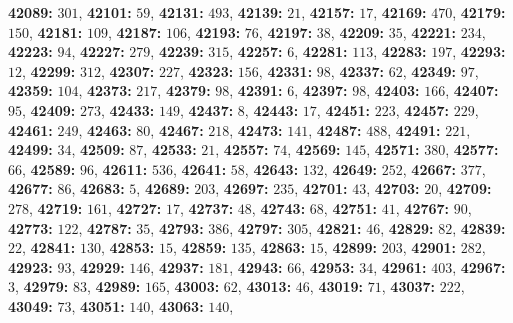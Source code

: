 \textsf{\bfseries 42089:} $301$, \textsf{\bfseries 42101:} $59$, \textsf{\bfseries 42131:} $493$, \textsf{\bfseries 42139:} $21$, \textsf{\bfseries 42157:} $17$, \textsf{\bfseries 42169:} $470$, \textsf{\bfseries 42179:} $150$, \textsf{\bfseries 42181:} $109$, \textsf{\bfseries 42187:} $106$, \textsf{\bfseries 42193:} $76$, \textsf{\bfseries 42197:} $38$, \textsf{\bfseries 42209:} $35$, \textsf{\bfseries 42221:} $234$, \textsf{\bfseries 42223:} $94$, \textsf{\bfseries 42227:} $279$, \textsf{\bfseries 42239:} $315$, \textsf{\bfseries 42257:} $6$, \textsf{\bfseries 42281:} $113$, \textsf{\bfseries 42283:} $197$, \textsf{\bfseries 42293:} $12$, \textsf{\bfseries 42299:} $312$, \textsf{\bfseries 42307:} $227$, \textsf{\bfseries 42323:} $156$, \textsf{\bfseries 42331:} $98$, \textsf{\bfseries 42337:} $62$, \textsf{\bfseries 42349:} $97$, \textsf{\bfseries 42359:} $104$, \textsf{\bfseries 42373:} $217$, \textsf{\bfseries 42379:} $98$, \textsf{\bfseries 42391:} $6$, \textsf{\bfseries 42397:} $98$, \textsf{\bfseries 42403:} $166$, \textsf{\bfseries 42407:} $95$, \textsf{\bfseries 42409:} $273$, \textsf{\bfseries 42433:} $149$, \textsf{\bfseries 42437:} $8$, \textsf{\bfseries 42443:} $17$, \textsf{\bfseries 42451:} $223$, \textsf{\bfseries 42457:} $229$, \textsf{\bfseries 42461:} $249$, \textsf{\bfseries 42463:} $80$, \textsf{\bfseries 42467:} $218$, \textsf{\bfseries 42473:} $141$, \textsf{\bfseries 42487:} $488$, \textsf{\bfseries 42491:} $221$, \textsf{\bfseries 42499:} $34$, \textsf{\bfseries 42509:} $87$, \textsf{\bfseries 42533:} $21$, \textsf{\bfseries 42557:} $74$, \textsf{\bfseries 42569:} $145$, \textsf{\bfseries 42571:} $380$, \textsf{\bfseries 42577:} $66$, \textsf{\bfseries 42589:} $96$, \textsf{\bfseries 42611:} $536$, \textsf{\bfseries 42641:} $58$, \textsf{\bfseries 42643:} $132$, \textsf{\bfseries 42649:} $252$, \textsf{\bfseries 42667:} $377$, \textsf{\bfseries 42677:} $86$, \textsf{\bfseries 42683:} $5$, \textsf{\bfseries 42689:} $203$, \textsf{\bfseries 42697:} $235$, \textsf{\bfseries 42701:} $43$, \textsf{\bfseries 42703:} $20$, \textsf{\bfseries 42709:} $278$, \textsf{\bfseries 42719:} $161$, \textsf{\bfseries 42727:} $17$, \textsf{\bfseries 42737:} $48$, \textsf{\bfseries 42743:} $68$, \textsf{\bfseries 42751:} $41$, \textsf{\bfseries 42767:} $90$, \textsf{\bfseries 42773:} $122$, \textsf{\bfseries 42787:} $35$, \textsf{\bfseries 42793:} $386$, \textsf{\bfseries 42797:} $305$, \textsf{\bfseries 42821:} $46$, \textsf{\bfseries 42829:} $82$, \textsf{\bfseries 42839:} $22$, \textsf{\bfseries 42841:} $130$, \textsf{\bfseries 42853:} $15$, \textsf{\bfseries 42859:} $135$, \textsf{\bfseries 42863:} $15$, \textsf{\bfseries 42899:} $203$, \textsf{\bfseries 42901:} $282$, \textsf{\bfseries 42923:} $93$, \textsf{\bfseries 42929:} $146$, \textsf{\bfseries 42937:} $181$, \textsf{\bfseries 42943:} $66$, \textsf{\bfseries 42953:} $34$, \textsf{\bfseries 42961:} $403$, \textsf{\bfseries 42967:} $3$, \textsf{\bfseries 42979:} $83$, \textsf{\bfseries 42989:} $165$, \textsf{\bfseries 43003:} $62$, \textsf{\bfseries 43013:} $46$, \textsf{\bfseries 43019:} $71$, \textsf{\bfseries 43037:} $222$, \textsf{\bfseries 43049:} $73$, \textsf{\bfseries 43051:} $140$, \textsf{\bfseries 43063:} $140$, 
